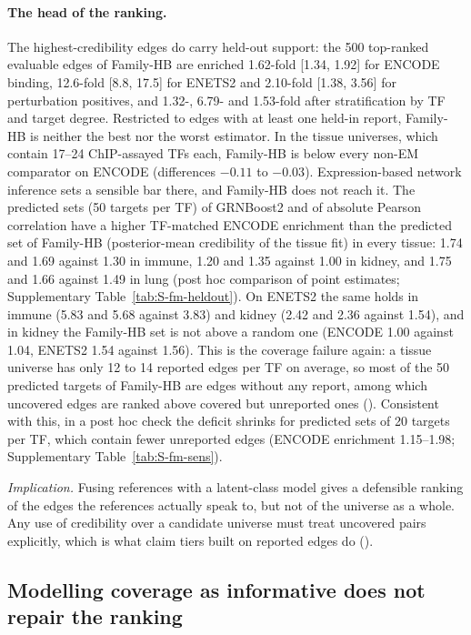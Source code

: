 \documentclass[11pt,a4paper]{article}
\begin{document}
\paragraph{The head of the ranking.}
The highest-credibility edges do carry held-out support: the 500 top-ranked evaluable edges of Family-HB are enriched 1.62-fold [1.34, 1.92] for ENCODE binding, 12.6-fold [8.8, 17.5] for ENETS2 and 2.10-fold [1.38, 3.56] for perturbation positives, and 1.32-, 6.79- and 1.53-fold after stratification by TF and target degree.
Restricted to edges with at least one held-in report, Family-HB is neither the best nor the worst estimator.
In the tissue universes, which contain 17--24 ChIP-assayed TFs each, Family-HB is below every non-EM comparator on ENCODE (differences \ensuremath{-0.11} to \ensuremath{-0.03}).
Expression-based network inference sets a sensible bar there, and Family-HB does not reach it.
The predicted sets (50 targets per TF) of GRNBoost2 and of absolute Pearson correlation have a higher TF-matched ENCODE enrichment than the predicted set of Family-HB (posterior-mean credibility of the tissue fit) in every tissue: 1.74 and 1.69 against 1.30 in immune, 1.20 and 1.35 against 1.00 in kidney, and 1.75 and 1.66 against 1.49 in lung (post hoc comparison of point estimates; Supplementary Table~\ref{tab:S-fm-heldout}).
On ENETS2 the same holds in immune (5.83 and 5.68 against 3.83) and kidney (2.42 and 2.36 against 1.54), and in kidney the Family-HB set is not above a random one (ENCODE 1.00 against 1.04, ENETS2 1.54 against 1.56).
This is the coverage failure again: a tissue universe has only 12 to 14 reported edges per TF on average, so most of the 50 predicted targets of Family-HB are edges without any report, among which uncovered edges are ranked above covered but unreported ones (). Consistent with this, in a post hoc check the deficit shrinks for predicted sets of 20 targets per TF, which contain fewer unreported edges (ENCODE enrichment 1.15--1.98; Supplementary Table~\ref{tab:S-fm-sens}).

\emph{Implication.} Fusing references with a latent-class model gives a defensible ranking of the edges the references actually speak to, but not of the universe as a whole. Any use of credibility over a candidate universe must treat uncovered pairs explicitly, which is what claim tiers built on reported edges do ().


\subsection{Modelling coverage as informative does not repair the ranking}\label{sec:res-obs}
\end{document}
